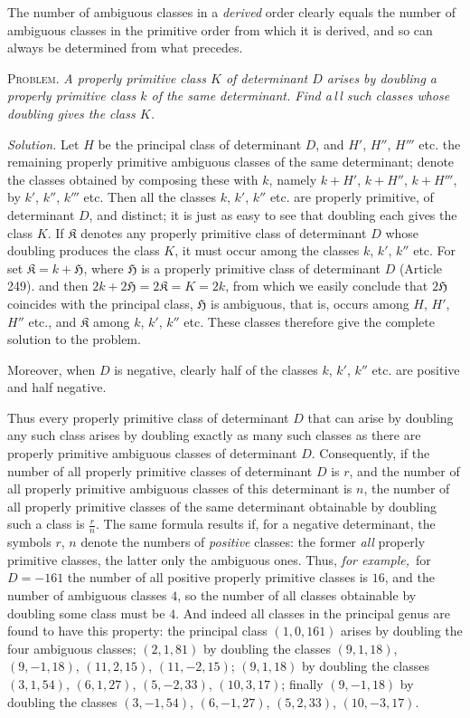 The number of ambiguous classes in a \textit{derived} order clearly equals the number of ambiguous classes in the primitive order from which it is derived, and so can always be determined from what precedes.

\textsc{Problem.} \textit{A properly primitive class $K$ of determinant $D$ arises by doubling a properly primitive class $k$ of the same determinant. Find a\,l\,l such classes whose doubling gives the class $K$.}

\textit{Solution.} Let $H$ be the principal class of determinant $D$, and $H'$, $H''$, $H'''$ etc. the remaining properly primitive ambiguous classes of the same determinant; denote the classes obtained by composing these with $k$, namely $k+H'$, $k+H''$, $k+H'''$, by $k'$, $k''$, $k'''$ etc. Then all the classes $k$, $k'$, $k''$ etc. are properly primitive, of determinant $D$, and distinct; it is just as easy to see that doubling each gives the class $K$. If $\mathfrak{K}$ denotes any properly primitive class of determinant $D$ whose doubling produces the class $K$, it must occur among the classes $k$, $k'$, $k''$ etc. For set $\mathfrak{K}=k+\mathfrak{H}$, where $\mathfrak{H}$ is a properly primitive class of determinant $D$ (Article 249). and then
$2k+2\mathfrak{H}=2\mathfrak{K}=K=2k$, from which we easily conclude that $2\mathfrak{H}$ coincides with the principal class, $\mathfrak{H}$ is ambiguous, that is, occurs among $H$, $H'$, $H''$ etc., and $\mathfrak{K}$ among $k$, $k'$, $k''$ etc. These classes therefore give the complete solution to the problem.

Moreover, when $D$ is negative, clearly half of the classes $k$, $k'$, $k''$ etc. are positive and half negative.

Thus every properly primitive class of determinant $D$ that can arise by doubling any such class arises by doubling exactly as many such classes as there are properly primitive ambiguous classes of determinant $D$. Consequently, if the number of all properly primitive classes of determinant $D$ is $r$, and the number of all properly primitive ambiguous classes of this determinant is $n$, the number of all properly primitive classes of the same determinant obtainable by doubling such a class is $\frac{r}{n}$. The same formula results if, for a negative determinant, the symbols $r$, $n$ denote the numbers of \textit{positive} classes: the former \textit{all} properly primitive classes, the latter only the ambiguous ones. Thus, \textit{for example,}\ for $D=-161$ the number of all positive properly primitive classes is $16$, and the number of ambiguous classes $4$, so the number of all classes obtainable by doubling some class must be $4$. And indeed all classes in the principal genus are found to have this property: the principal class $(1,0,161)$ arises by doubling the four ambiguous classes; $(2,1,81)$ by doubling the classes $(9,1,18)$, $(9,-1,18)$, $(11,2,15)$, $(11,-2,15)$; $(9,1,18)$ by doubling the classes $(3,1,54)$, $(6,1,27)$, $(5,-2,33)$, $(10,3,17)$; finally $(9,-1,18)$ by doubling the classes $(3,-1,54)$, $(6,-1,27)$, $(5,2,33)$, $(10,-3,17)$.
